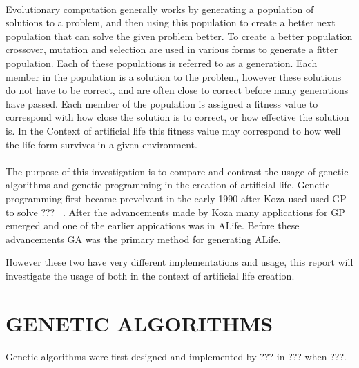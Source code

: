 \documentclass[10pt,twocolumn]{article}
\begin{document}
\paragraph{}
Evolutionary computation generally works by generating a population of solutions to a problem, and then using this population to create a better next population that can solve the given problem better.
To create a better population crossover, mutation and selection are used in various forms to generate a fitter population.
Each of these populations is referred to as a generation.
Each member in the population is a solution to the problem, however these solutions do not have to be correct, and are often close to correct before many generations have passed.
Each member of the population is assigned a fitness value to correspond with how close the solution is to correct, or how effective the solution is.
In the Context of artificial life this fitness value may correspond to how well the life form survives in a given environment.

\paragraph{}
The purpose of this investigation is to compare and contrast the usage of genetic algorithms and genetic programming in the creation of artificial life. Genetic programming first became prevelvant in the early 1990 after Koza used used GP to solve ??? ~\cite{Koza90}. After the advancements made by Koza many applications for GP emerged and one of the earlier appications was in ALife. Before these advancements GA was the primary method for generating ALife.

However these two have very different implementations and usage, this report will investigate the usage of both in the context of artificial life creation. 

\paragraph{}



\section{GENETIC ALGORITHMS}

Genetic algorithms were first designed and implemented by ??? in ??? when ???.
\end{document}
